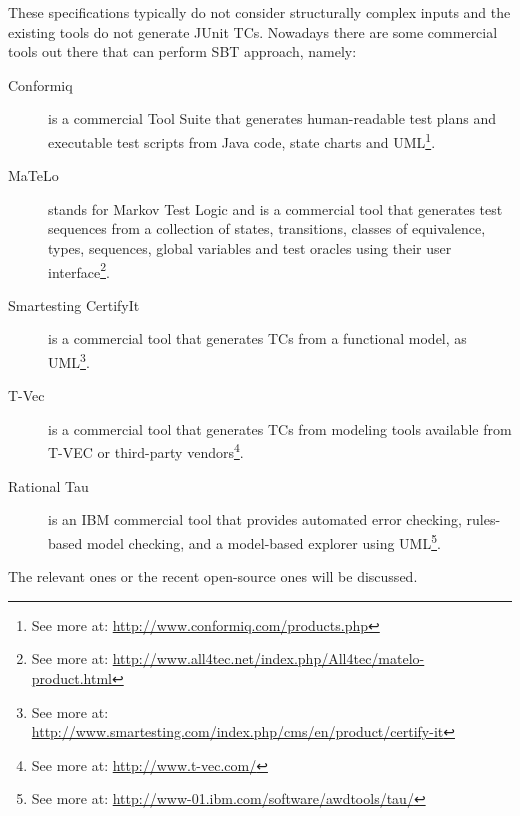 These specifications typically do not consider structurally complex inputs and the existing tools do not generate JUnit \ac{TC}s.
Nowadays there are some commercial tools out there that can perform \ac{SBT} approach, namely:
\begin{description}
\item[Conformiq] is a commercial Tool Suite that generates
human-readable test plans and executable test scripts from Java code, state charts and \ac{UML}\footnote{See more at: \url{http://www.conformiq.com/products.php}}.
\item[MaTeLo] stands for Markov Test Logic and is a commercial tool
that generates test sequences from a collection of states, transitions, classes of equivalence, types, sequences, global variables and test oracles
using their user interface\footnote{See more at: \url{http://www.all4tec.net/index.php/All4tec/matelo-product.html}}.
\item[Smartesting CertifyIt] is a commercial tool that generates \ac{TC}s from a functional model, as \ac{UML}\footnote{See more at: \url{http://www.smartesting.com/index.php/cms/en/product/certify-it}}.
\item[T-Vec] is a commercial tool that generates \ac{TC}s from modeling tools available from T-VEC or third-party vendors\footnote{See more at: \url{http://www.t-vec.com/}}.
\item[Rational Tau] is an \ac{IBM} commercial tool that provides automated error checking, rules-based model checking, and a model-based explorer using
\ac{UML}\footnote{See more at: \url{http://www-01.ibm.com/software/awdtools/tau/}}.
\end{description}

The relevant ones or the recent open-source ones will be discussed.
